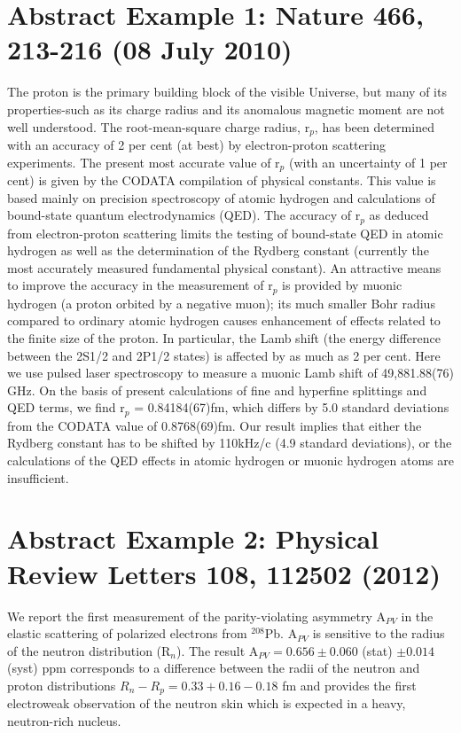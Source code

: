 \documentclass{article}
\begin{document}
\section{Abstract Example 1: Nature 466, 213-216 (08 July 2010)}

The proton is the primary building block of the visible Universe, but many
of its properties-such as its charge radius and its anomalous magnetic 
moment are not well understood. The root-mean-square charge radius, r$_p$,
has been determined with an accuracy of 2 per cent (at best) by electron-proton
scattering experiments. The present most accurate value of r$_p$ (with an
uncertainty of 1 per cent) is given by the CODATA compilation of physical
constants. This value is based mainly on precision spectroscopy of atomic
hydrogen and calculations of bound-state quantum electrodynamics (QED).
The accuracy of r$_p$ as deduced from electron-proton scattering limits
the testing of bound-state QED in atomic hydrogen as well as the
determination of the Rydberg constant (currently the most accurately measured
fundamental physical constant). An attractive means to improve the accuracy
in the measurement of r$_p$ is provided by muonic hydrogen (a proton
orbited by a negative muon); its much smaller Bohr radius compared to
ordinary atomic hydrogen causes enhancement of effects related to the
finite size of the proton. In particular, the Lamb shift (the energy
difference between the 2S1/2 and 2P1/2 states) is affected by as much
as 2 per cent. Here we use pulsed laser spectroscopy to measure a muonic
Lamb shift of 49,881.88(76) GHz. On the basis of present calculations of
fine and hyperfine splittings and QED terms, we find r$_p$ = 0.84184(67)fm,
which differs by 5.0 standard deviations from the CODATA value of 
0.8768(69)fm. Our result implies that either the Rydberg constant has to
be shifted by 110kHz/c (4.9 standard deviations), or the calculations of
the QED effects in atomic hydrogen or muonic hydrogen atoms are insufficient.

\section{Abstract Example 2: Physical Review Letters 108, 112502 (2012)}

We report the first measurement of the parity-violating asymmetry A$_{PV}$
in the elastic scattering of polarized electrons from $^{208}$Pb. A$_{PV}$
is sensitive to the radius of the neutron distribution (R$_n$). The result
A$_{PV} = 0.656 \pm 0.060$ (stat) $\pm 0.014 $(syst) ppm corresponds to a 
difference between the radii of the neutron and proton distributions 
$R_n - R_p = 0.33 +0.16 -0.18$ fm and provides the first electroweak
observation of the neutron skin which is expected in a heavy, neutron-rich nucleus.
\end{document}

